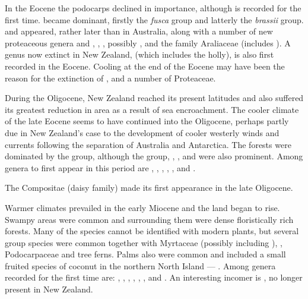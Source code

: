 In the Eocene the podocarps declined in importance, although  is recorded for the first time.  became dominant, firstly the \emph{fusca} group and latterly the \emph{brassii} group.  and  appeared, rather later than in Australia, along with a number of new proteaceous genera and , , , possibly , and the family Araliaceae (includes ).
A genus now extinct in New Zealand,  (which includes the holly), is also first recorded in the Eocene.
Cooling at the end of the Eocene may have been the reason for the extinction of ,  and a number of Proteaceae.

During the Oligocene, New Zealand reached its present latitudes and also suffered its greatest reduction in area as a result of sea encroachment.
The cooler climate of the late Eocene seems to have continued into the Oligocene, perhaps partly due in New Zealand's case to the development of cooler westerly winds and currents following the separation of Australia and Antarctica.
The forests were dominated by the  group, although the  group, , ,  and  were also prominent.
Among genera to first appear in this period are , , , , ,  and .

The Compositae (daisy family) made its first appearance in the late Oligocene.

Warmer climates prevailed in the early Miocene and the land began to rise.
Swampy areas were common and surrounding them were dense floristically rich forests.
Many of the species cannot be identified with modern plants, but several  group species were common together with Myrtaceae (possibly including ), , Podocarpaceae and tree ferns.
Palms also were common and included a small fruited species of coconut in the northern North Island --- .
Among genera recorded for the first time are: , , , , , ,  and .
An interesting incomer is , no longer present in New Zealand.

